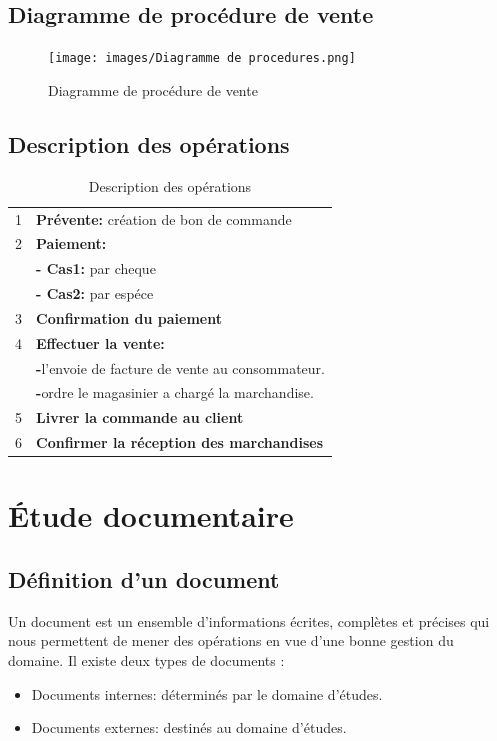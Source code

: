 \documentclass[edit,12pt,a4paper,ChapStyle,oneside,doubleinterligne]{report}
\begin{document}
\subsection{Diagramme de procédure de vente}
\begin{figure}[h!]\label{fig:procedures}
\centering
\texttt{[image: images/Diagramme de procedures.png]}
\caption{Diagramme de procédure de vente }
\end{figure}
\subsection{Description des opérations}
\begin{table}[h!]
    \centering
    \begin{tabular}{|c|l|}
        \hline
        1 & \textbf{Prévente:} création de bon de commande \\
        2 & \textbf{Paiement:} \\
          & \textbf{- Cas1:} par cheque \\
          & \textbf{- Cas2:} par espéce \\
        3 & \textbf{Confirmation du paiement} \\
        4 & \textbf{Effectuer la vente: } \\
          & \textbf{-}l’envoie de facture de vente au consommateur. \\
          & \textbf{-}ordre le magasinier a chargé la marchandise. \\
        5 & \textbf{Livrer la commande au client} \\
        6 & \textbf{Confirmer la réception des marchandises} \\
       \hline
    \end{tabular}
    \caption{Description des opérations}
    \label{tab:auxiliaire Description des opérations}
\end{table}
\section{Étude documentaire}
\subsection{Définition d’un document }
Un document est un ensemble d'informations écrites, complètes et précises qui nous permettent de mener des opérations en vue d'une bonne gestion du domaine. Il existe deux types de documents :
\begin{itemize}
    \item Documents internes: déterminés par le domaine d'études.
    \item Documents externes: destinés au domaine d'études.
\end{itemize}
\end{document}
